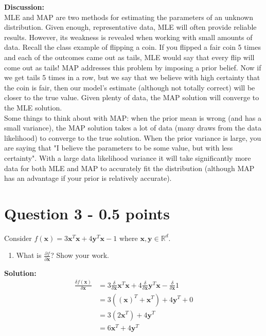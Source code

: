 \documentclass[11pt]{article}
\begin{document}
\noindent
\textbf{Discussion:} \\
\noindent
MLE and MAP are two methods for estimating the parameters of an unknown distribution.  Given enough, representative data, MLE will often provide reliable results.  However, its weakness is revealed when working with small amounts of data. Recall the class example of flipping a coin.  If you flipped a fair coin 5 times and each of the outcomes came out as tails, MLE would say that every flip will come out as tails!  MAP addresses this problem by imposing a prior belief.  Now if we get tails 5 times in a row, but 
we say that we believe with high certainty that the coin is fair, then our model's estimate (although not totally correct) will be closer to the true value.  Given plenty of data, the MAP solution will converge to the MLE solution. \\
\noindent
Some things to think about with MAP: when the prior mean is wrong (and has a small variance), the MAP solution takes a lot of data (many draws from the data likelihood) to converge to the true solution.  When the prior variance is large, you are saying that "I believe the parameters to be some value,  but with less certainty".  With a large data likelihood variance it will take significantly more data for both MLE and MAP to accurately fit the distribution (although MAP has an advantage if your prior is relatively accurate).   

\section*{Question 3 - 0.5 points}
Consider $f(\mathbf{x}) = 3\mathbf{x}^T\mathbf{x} + 4\mathbf{y}^T\mathbf{x} - 1$ where $\mathbf{x}, \mathbf{y} \in \mathbb{R}^d$. 
\begin{enumerate} 
\item What is $\frac{\partial f}{\partial\mathbf{x}}$? Show your work. 
\end{enumerate}

\textbf{Solution:}
\begin{align*}
\frac{\delta f(\mathbf{x})}{\delta \mathbf{x}} &= 3\frac{\delta}{\delta \mathbf{x}} \mathbf{x}^T\mathbf{x}  + 4 \frac{\delta}{\delta \mathbf{x}} \mathbf{y}^T\mathbf{x} - \frac{\delta}{\delta \mathbf{x}} 1\\
&= 3((\mathbf{x})^T + \mathbf{x}^T)  + 4 \mathbf{y}^T + 0\\
&= 3(2\mathbf{x}^T)  + 4 \mathbf{y}^T\\
&= 6\mathbf{x}^T  + 4 \mathbf{y}^T
\end{align*}
\end{document}

